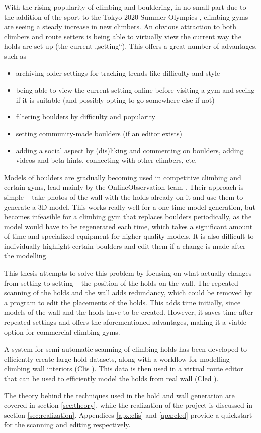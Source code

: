 
With the rising popularity of climbing and bouldering, in no small part due to the addition of the sport to the Tokyo 2020 Summer Olympics \cite{olympics}, climbing gyms are seeing a steady increase in new climbers.
An obvious attraction to both climbers and route setters is being able to virtually view the current way the holds are set up (the current „setting“).
This offers a great number of advantages, such as

\begin{itemize}
	\item archiving older settings for tracking trends like difficulty and style
	\item being able to view the current setting online before visiting a gym and seeing if it is suitable (and possibly opting to go somewhere else if not)
	\item filtering boulders by difficulty and popularity
	\item setting community-made boulders (if an editor exists)
	\item adding a social aspect by (dis)liking and commenting on boulders, adding videos and beta hints, connecting with other climbers, etc.
\end{itemize}

Models of boulders are gradually becoming used in competitive climbing and certain gyms, lead mainly by the OnlineObservation team \cite{onlineobservation}.
Their approach is simple -- take photos of the wall with the holds already on it and use them to generate a 3D model.
This works really well for a one-time model generation, but becomes infeasible for a climbing gym that replaces boulders periodically, as the model would have to be regenerated each time, which takes a significant amount of time and specialized equipment for higher quality models.
It is also difficult to individually highlight certain boulders and edit them if a change is made after the modelling.

This thesis attempts to solve this problem by focusing on what actually changes from setting to setting -- the position of the holds on the wall.
The repeated scanning of the holds and the wall adds redundancy, which could be removed by a program to edit the placements of the holds.
This adds time initially, since models of the wall and the holds have to be created.
However, it saves time after repeated settings and offers the aforementioned advantages, making it a viable option for commercial climbing gyms.

A system for semi-automatic scanning of climbing holds has been developed to efficiently create large hold datasets, along with a workflow for modelling climbing wall interiors (Clis \cite{clis}).
This data is then used in a virtual route editor that can be used to efficiently model the holds from real wall (Cled \cite{cled}).

The theory behind the techniques used in the hold and wall generation are covered in section \ref{sec:theory}, while the realization of the project is discussed in section \ref{sec:realization}.
Appendices \ref{apx:clis} and \ref{apx:cled} provide a quickstart for the scanning and editing respectively.
